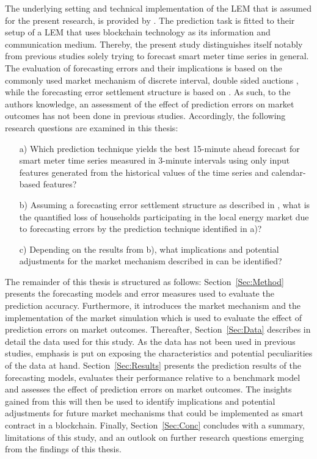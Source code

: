 The underlying setting and technical implementation of the LEM that is assumed for the present research, is provided by \citet{Mengelkamp:2018a}. The prediction task is fitted to their setup of a LEM that uses blockchain technology as its information and communication medium. Thereby, the present study distinguishes itself notably from previous studies solely trying to forecast smart meter time series in general. The evaluation of forecasting errors and their implications is based on the commonly used market mechanism of discrete interval, double sided auctions \citep[e.g.,][]{Block:2008, Buchmann:2013}, while the forecasting error settlement structure is based on \citep{Mengelkamp:2018a}. As such, to the authors knowledge, an assessment of the effect of prediction errors on market outcomes has not been done in previous studies. Accordingly, the following research questions are examined in this thesis:
\begin{itemize}
    \item[a)] Which prediction technique yields the best 15-minute ahead forecast  for smart meter time series measured in 3-minute intervals using only input features generated from the historical values of the time series and calendar-based features?
    \item[b)] Assuming a forecasting error settlement structure as described in \citet{Mengelkamp:2018a}, what is the quantified loss of households participating in the local energy market due to forecasting errors by the prediction technique identified in a)?
    \item[c)] Depending on the results from b), what implications and potential adjustments for the market mechanism described in \citet{Mengelkamp:2018a} can be identified?
\end{itemize}

The remainder of this thesis is structured as follows: Section~\ref{Sec:Method} presents the forecasting models and error measures used to evaluate the prediction accuracy. Furthermore, it introduces the market mechanism and the implementation of the market simulation which is used to evaluate the effect of prediction errors on market outcomes. Thereafter, Section~\ref{Sec:Data} describes in detail the data used for this study. As the data has not been used in previous studies, emphasis is put on exposing the characteristics and potential peculiarities of the data at hand. Section~\ref{Sec:Results} presents the prediction results of the forecasting models, evaluates their performance relative to a benchmark model and assesses the effect of prediction errors on market outcomes. The insights gained from this will then be used to identify implications and potential adjustments for future market mechanisms that could be implemented as smart contract in a blockchain. Finally, Section~\ref{Sec:Conc} concludes with a summary, limitations of this study, and an outlook on further research questions emerging from the findings of this thesis.


